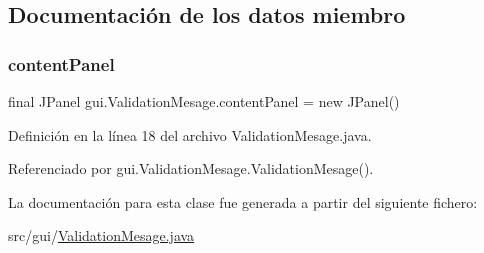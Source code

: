\subsection{Documentación de los datos miembro}
\mbox{\label{classgui_1_1_validation_mesage_a6c81a55b78329c6ac3e6f31b11e5e966}} 
\subsubsection{\texorpdfstring{contentPanel}{contentPanel}}
{\footnotesize\ttfamily final J\+Panel gui.\+Validation\+Mesage.\+content\+Panel = new J\+Panel()\hspace{0.3cm}{\ttfamily [private]}}



Definición en la línea 18 del archivo Validation\+Mesage.\+java.



Referenciado por gui.\+Validation\+Mesage.\+Validation\+Mesage().



La documentación para esta clase fue generada a partir del siguiente fichero\+:\begin{DoxyCompactItemize}
\item 
src/gui/\mbox{\hyperlink{_validation_mesage_8java}{Validation\+Mesage.\+java}}\end{DoxyCompactItemize}
